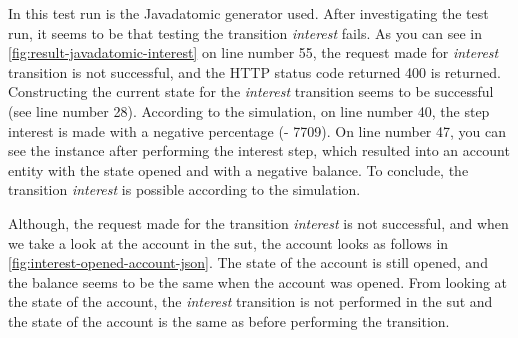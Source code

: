 In this test run is the Javadatomic generator used. After investigating the test
run, it seems to be that testing the transition \textit{interest} fails. As you can see
in \autoref{fig:result-javadatomic-interest} on line number 55, the request made
for \textit{interest} transition is not successful, and the HTTP status code returned 400
is returned. Constructing the current state for the \textit{interest} transition seems to
be successful (see line number 28). According to the simulation, on line number
40, the step interest is made with a negative percentage (- 7709). On line
number 47, you can see the instance after performing the interest step, which
resulted into an account entity with the state opened and with a negative
balance. To conclude, the transition \textit{interest} is possible according to the
simulation.

Although, the request made for the transition \textit{interest} is not
successful, and when we take a look at the account in the \gls{sut}, the account looks
as follows in \autoref{fig:interest-opened-account-json}. The state of the
account is still opened, and the balance seems to be the same when the account
was opened. From looking at the state of the account, the \textit{interest} transition
is not performed in the \gls{sut} and the state of the account is the same as before
performing the transition.


